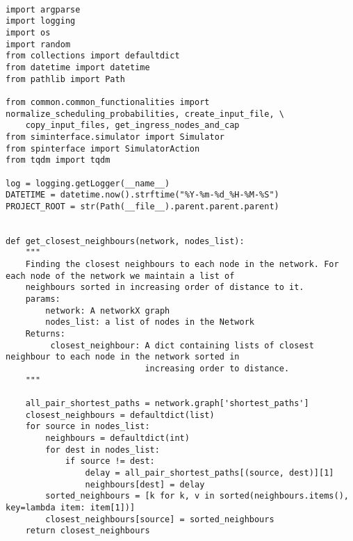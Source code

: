 \begin{lstlisting}

import argparse
import logging
import os
import random
from collections import defaultdict
from datetime import datetime
from pathlib import Path

from common.common_functionalities import normalize_scheduling_probabilities, create_input_file, \
    copy_input_files, get_ingress_nodes_and_cap
from siminterface.simulator import Simulator
from spinterface import SimulatorAction
from tqdm import tqdm

log = logging.getLogger(__name__)
DATETIME = datetime.now().strftime("%Y-%m-%d_%H-%M-%S")
PROJECT_ROOT = str(Path(__file__).parent.parent.parent)


def get_closest_neighbours(network, nodes_list):
    """
    Finding the closest neighbours to each node in the network. For each node of the network we maintain a list of
    neighbours sorted in increasing order of distance to it.
    params:
        network: A networkX graph
        nodes_list: a list of nodes in the Network
    Returns:
         closest_neighbour: A dict containing lists of closest neighbour to each node in the network sorted in
                            increasing order to distance.
    """

    all_pair_shortest_paths = network.graph['shortest_paths']
    closest_neighbours = defaultdict(list)
    for source in nodes_list:
        neighbours = defaultdict(int)
        for dest in nodes_list:
            if source != dest:
                delay = all_pair_shortest_paths[(source, dest)][1]
                neighbours[dest] = delay
        sorted_neighbours = [k for k, v in sorted(neighbours.items(), key=lambda item: item[1])]
        closest_neighbours[source] = sorted_neighbours
    return closest_neighbours



\end{lstlisting}
